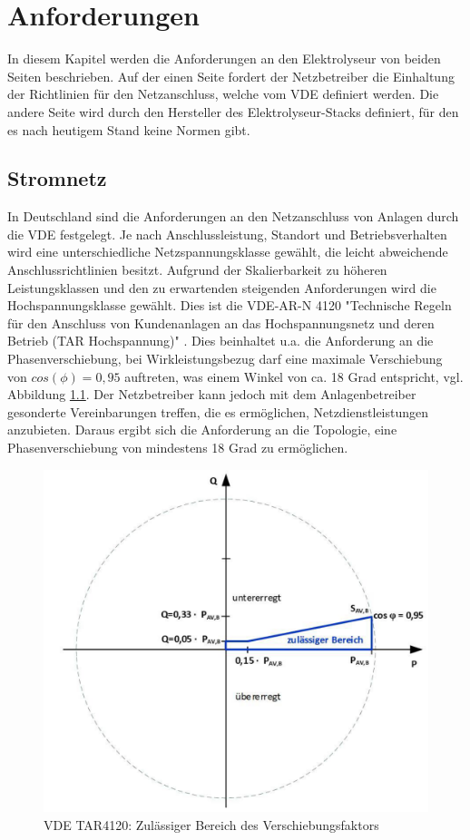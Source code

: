 \chapter{Anforderungen}
\label{chap:Anforderungen}
In diesem Kapitel werden die Anforderungen an den Elektrolyseur von beiden Seiten beschrieben. Auf der einen Seite fordert der Netzbetreiber die Einhaltung der Richtlinien für den Netzanschluss, welche vom \gls{VDE} definiert werden. Die andere Seite wird durch den Hersteller des Elektrolyseur-Stacks definiert, für den es nach heutigem Stand keine Normen gibt. 
\section {Stromnetz} \label{sec:AnfStromnetz}
In Deutschland sind die Anforderungen an den Netzanschluss von Anlagen durch die \gls{VDE} festgelegt. Je nach Anschlussleistung, Standort und Betriebsverhalten wird eine unterschiedliche Netzspannungsklasse gewählt, die leicht abweichende Anschlussrichtlinien besitzt. Aufgrund der Skalierbarkeit zu höheren Leistungsklassen und den zu erwartenden steigenden Anforderungen wird die Hochspannungsklasse gewählt. Dies ist die VDE-AR-N 4120 "Technische Regeln für den Anschluss von Kundenanlagen an das Hochspannungsnetz und deren Betrieb (TAR Hochspannung)" \cite{VDEARN4120}.
Dies beinhaltet u.a. die Anforderung an die Phasenverschiebung, bei Wirkleistungsbezug darf eine maximale Verschiebung von $cos(\phi)=0,95$ auftreten, was einem Winkel von ca. 18 Grad entspricht, vgl. Abbildung \ref{fig:tar4120pq}. Der Netzbetreiber kann jedoch mit dem Anlagenbetreiber gesonderte Vereinbarungen treffen, die es ermöglichen, Netzdienstleistungen anzubieten. Daraus ergibt sich die Anforderung an die Topologie, eine Phasenverschiebung von mindestens 18 Grad zu ermöglichen.\\
\begin{figure}
	\centering
	\includegraphics[width=0.6\linewidth]{content/Grafiken/TAR4120_PQ}
	\caption[Zulässiger Bereich des Verschiebungsfaktors cos $\phi$ bei Wirkleistungsbezug]{VDE TAR4120: Zulässiger Bereich des Verschiebungsfaktors \cite{VDEARN4120}}
	\label{fig:tar4120pq}
\end{figure}
